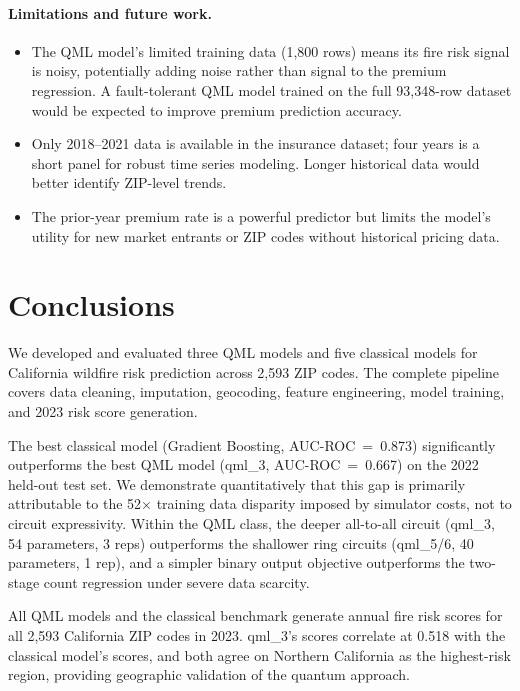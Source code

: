 \documentclass[11pt,a4paper]{article}
\begin{document}
\paragraph{Limitations and future work.}
\begin{itemize}[leftmargin=*]
    \item The QML model's limited training data (1,800 rows) means its fire
          risk signal is noisy, potentially adding noise rather than signal
          to the premium regression. A fault-tolerant QML model trained on the
          full 93,348-row dataset would be expected to improve premium prediction
          accuracy.
    \item Only 2018--2021 data is available in the insurance dataset; four years
          is a short panel for robust time series modeling. Longer historical
          data would better identify ZIP-level trends.
    \item The prior-year premium rate is a powerful predictor but limits
          the model's utility for new market entrants or ZIP codes
          without historical pricing data.
\end{itemize}

\section{Conclusions}
\label{sec:conclusions}

We developed and evaluated three QML models and five classical models for
California wildfire risk prediction across 2,593 ZIP codes. The complete pipeline
covers data cleaning, imputation, geocoding, feature engineering, model training,
and 2023 risk score generation.

The best classical model (Gradient Boosting, AUC-ROC~=~0.873) significantly
outperforms the best QML model (qml\_3, AUC-ROC~=~0.667) on the 2022 held-out
test set. We demonstrate quantitatively that this gap is primarily attributable
to the 52$\times$ training data disparity imposed by simulator costs, not to
circuit expressivity. Within the QML class, the deeper all-to-all circuit
(qml\_3, 54 parameters, 3 reps) outperforms the shallower ring circuits
(qml\_5/6, 40 parameters, 1 rep), and a simpler binary output objective
outperforms the two-stage count regression under severe data scarcity.

All QML models and the classical benchmark generate annual fire risk scores for
all 2,593 California ZIP codes in 2023. qml\_3's scores correlate at 0.518
with the classical model's scores, and both agree on Northern California as
the highest-risk region, providing geographic validation of the quantum approach.
\end{document}
